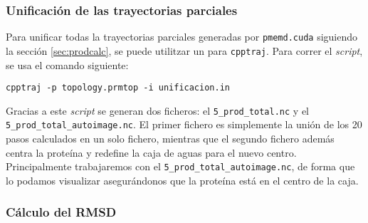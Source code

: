        \subsubsection{Unificación de las trayectorias parciales}
            Para unificar todas la trayectorias parciales generadas por \texttt{pmemd.cuda} siguiendo la sección \ref{sec:prodcalc}, se puede utilitzar un  para \texttt{cpptraj}. Para correr el \textit{script}, se usa el comando siguiente:
            \begin{center}
                \texttt{cpptraj -p topology.prmtop -i unificacion.in}
            \end{center}
            
            Gracias a este \textit{script} se generan dos ficheros: el \texttt{5\_prod\_total.nc} y el \texttt{5\_prod\_total\_autoimage.nc}. El primer fichero es simplemente la unión de los 20 pasos calculados en un solo fichero, mientras que el segundo fichero además centra la proteína y redefine la caja de aguas para el nuevo centro. Principalmente trabajaremos con el \texttt{5\_prod\_total\_autoimage.nc}, de forma que lo podamos visualizar asegurándonos que la proteína está en el centro de la caja.
            
        \subsubsection{Cálculo del RMSD}
            
        